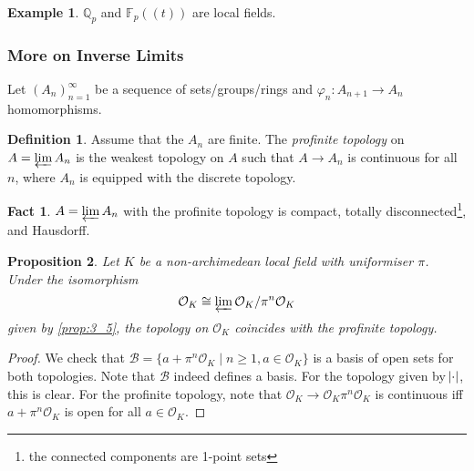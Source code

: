\documentclass[11pt]{article}
\theoremstyle{definition}
\newtheorem{definition}{Definition}[subsection]
\newtheorem*{example}{Example}
\newtheorem*{fact}{Fact}
\theoremstyle{plain}
\newtheorem{proposition}[definition]{Proposition}
\theoremstyle{remark}
\newcommand{\FF}{\mathbb{F}}
\newcommand{\QQ}{\mathbb{Q}}
\newcommand{\cO}{\mathcal{O}}
\begin{document}
\begin{example}
    $\QQ_p$ and $\FF_p((t))$ are local fields.
\end{example}

\subsubsection*{More on Inverse Limits}
Let $(A_n)_{n=1}^\infty$ be a sequence of sets/groups/rings and $\varphi_n : A_{n+1} \to A_n$ homomorphisms.

\begin{definition}\label{def:7_3}
    Assume that the $A_n$ are finite. The \emph{profinite topology} on $A = \varprojlim A_n$ is the weakest topology on $A$ such that $A \to A_n$ is continuous for all $n$, where $A_n$ is equipped with the discrete topology.
\end{definition}

\begin{fact}
    $A = \varprojlim A_n$ with the profinite topology is compact, totally disconnected\footnote{the connected components are 1-point sets}, and Hausdorff.
\end{fact}

\begin{proposition}\label{prop:7_4}
    Let $K$ be a non-archimedean local field with uniformiser $\pi$. Under the isomorphism
    \begin{equation*}
        \cO_K \cong \varprojlim \cO_K / \pi^n \cO_K
    \end{equation*}
    given by \autoref{prop:3_5}, the topology on $\cO_K$ coincides with the profinite topology.
\end{proposition}
\begin{proof}
    We check that $\mathcal{B} = \{a + \pi^n\cO_K \mid n \ge 1, a \in \cO_K\}$ is a basis of open sets for both topologies. Note that $\mathcal{B}$ indeed defines a basis. For the topology given by $\abs{\cdot}$, this is clear. For the profinite topology, note that $\cO_K \to \cO_K \pi^n \cO_K$ is continuous iff $a + \pi^n \cO_K$ is open for all $a \in \cO_K$.
\end{proof}
\end{document}
